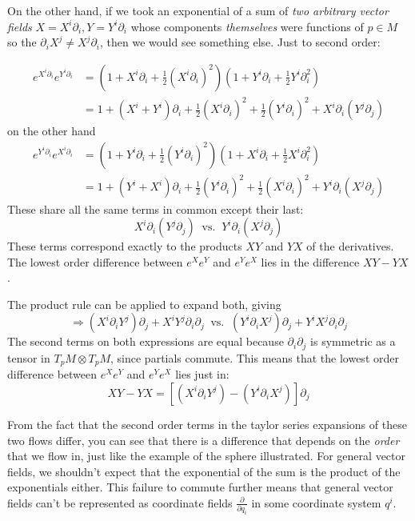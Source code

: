 		On the other hand, if we took an exponential of a sum of \emph{two arbitrary vector fields} $X=X^i \partial_i, Y = Y^i \partial_i$ whose components \emph{themselves} were functions of $p \in M$ so the $\partial_i X^j \neq X^j \partial_i$, then we would see something else. Just to second order: 
		
		\begin{align*}
			e^{X^i \partial_i} e^{Y^i \partial_i} &= (1 + X^i \partial_i + \frac{1}{2} {(X^i \partial_i)^2})(1 + Y^i \partial_i + \frac{1}{2} {Y^i \partial_i^2})\\
			& = 1 + (X^i + Y^i) \partial_i + \frac{1}{2} (X^i \partial_i)^2 + \frac{1}{2}(Y^i \partial_i)^2 + X^i \partial_i (Y^j \partial_j)
		\end{align*}
		on the other hand 
		\begin{align*}
			e^{Y^i \partial_i} e^{X^i \partial_i} &= (1 + Y^i \partial_i + \frac{1}{2} {(Y^i \partial_i)^2})(1 + X^i \partial_i + \frac{1}{2} {X^i \partial_i^2})\\
			& = 1 + (Y^i + X^i) \partial_i + \frac{1}{2} (Y^i \partial_i)^2 + \frac{1}{2}(X^i \partial_i)^2 + Y^i \partial_i (X^j \partial_j)
		\end{align*}
		These share all the same terms in common except their last:
		\begin{equation*}
			X^i \partial_i (Y^j \partial_j) ~\text{ vs. }~ Y^i \partial_i (X^j \partial_j)
		\end{equation*}
		These terms correspond exactly to the products $XY$ and $YX$ of the derivatives. The lowest order difference between $e^X e^Y$ and $e^Y e^X$ lies in the difference $XY - YX$. 
		
		The product rule can be applied to expand both, giving
		\begin{equation*}
			\Rightarrow (X^i \partial_i Y^j) \partial_j + X^i Y^j \partial_i \partial_j  ~\text{ vs. }~ (Y^i \partial_i X^j) \partial_j + Y^i X^j \partial_i \partial_j
		\end{equation*}
		The second terms on both expressions are equal because $\partial_i \partial_j$ is symmetric as a tensor in $T_p M \otimes T_p M$, since partials commute. This means that the lowest order difference between $e^X e^Y$ and $e^Y e^X$ lies just in:
		\begin{equation}\label{eq:first_commutator}
			XY - YX = \left[  (X^i \partial_i Y^j) - (Y^i \partial_i X^j) \right] \partial_j 
		\end{equation}
		
		From the fact that the second order terms in the taylor series expansions of these two flows differ, you can see that there is a difference that depends on the \emph{order} that we flow in, just like the example of the sphere illustrated. For general vector fields, we shouldn't expect that the exponential of the sum is the product of the exponentials either. %
		This failure to commute further means that general vector fields can't be represented as coordinate fields  $\frac{\partial}{\partial q_i}$ in some coordinate system $q^i$. 
		
